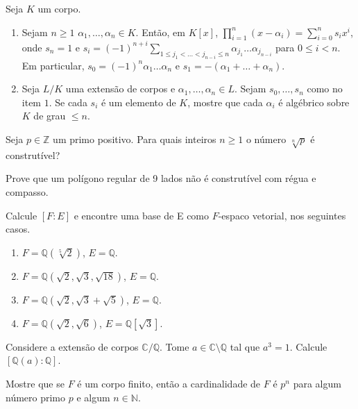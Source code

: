 \begin{exer} Seja $K$ um corpo.
    
    \begin{enumerate}
        \item Sejam $n\geq 1$ $\alpha_1, \dots, \alpha_n \in K$. Então, em $K[x]$, $\prod_{i=1}^n (x-\alpha_i)=\sum_{i=0}^n s_i x^i$, onde $s_n=1$ e $s_i=(-1)^{n+i}\sum_{1\leq j_1<\dots<j_{n-i}\leq n}\alpha_{j_1}\dots \alpha_{j_{n-i}}$ para $0\leq i<n$. Em particular, $s_0=(-1)^n \alpha_1\dots\alpha_n$ e $s_1=-(\alpha_1+\dots+\alpha_n)$.
        \item Seja $L/K$ uma extensão de corpos e $\alpha_1, \dots, \alpha_n \in L$. Sejam $s_0, \dots, s_n$ como no item $1$. Se cada $s_i$ é um elemento de $K$, mostre que cada $\alpha_i$ é algébrico sobre $K$ de grau $\leq n$.
    \end{enumerate}
\end{exer}

\begin{exer}
    Seja $p\in \mathbb Z$ um primo positivo.
    Para quais inteiros $n\geq 1$ o número $\sqrt[n]{p}$ é construtível?
\end{exer}

\begin{exer}
 Prove que um polígono regular de 9 lados não é construtível com régua e compasso.
\end{exer}

\begin{exer}
 Calcule $[F:E]$ e encontre uma base de E como $F$-espaco vetorial, nos seguintes casos.
\begin{enumerate}[label=(\alph*)]
    \item $F = \mathbb Q(\sqrt[5]{2})$, $E = \mathbb Q$.
    \item $F = \mathbb Q(\sqrt{2}, \sqrt{3}, \sqrt{18})$, $E = \mathbb Q$.
    \item $F = \mathbb Q(\sqrt{2}, \sqrt 3 + \sqrt 5)$, $E = \mathbb Q$.
    \item $F = \mathbb Q(\sqrt{2}, \sqrt 6)$, $E = \mathbb Q[\sqrt 3]$.
\end{enumerate}
\end{exer}

\begin{exer}
 Considere a extensão de corpos $\mathbb C/\mathbb Q$. Tome $a \in \mathbb C\setminus \mathbb Q$ tal que $a^3=1$. Calcule $[\mathbb Q(a):\mathbb Q]$.
\end{exer}

\begin{exer}
 Mostre que se $F$ é um corpo finito, então a cardinalidade de $F$ é $p^n$ para algum número primo $p$ e algum $n \in \mathbb N$.
\end{exer}

